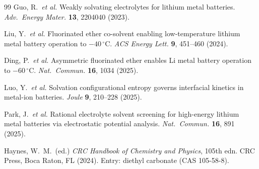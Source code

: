 \documentclass[11pt]{article}
\theoremstyle{plain}
\theoremstyle{definition}
\theoremstyle{remark}
\begin{document}
\begin{thebibliography}{99}
Guo, R.\ \textit{et al.}
Weakly solvating electrolytes for lithium metal batteries.
\textit{Adv.\ Energy Mater.} \textbf{13}, 2204040 (2023).

Liu, Y.\ \textit{et al.}
Fluorinated ether co-solvent enabling low-temperature lithium metal battery
operation to $-40\,^{\circ}$C.
\textit{ACS Energy Lett.} \textbf{9}, 451--460 (2024).

Ding, P.\ \textit{et al.}
Asymmetric fluorinated ether enables Li metal battery operation to
$-60\,^{\circ}$C.
\textit{Nat.\ Commun.} \textbf{16}, 1034 (2025).

Luo, Y.\ \textit{et al.}
Solvation configurational entropy governs interfacial kinetics in
metal-ion batteries.
\textit{Joule} \textbf{9}, 210--228 (2025).

Park, J.\ \textit{et al.}
Rational electrolyte solvent screening for high-energy lithium metal batteries
via electrostatic potential analysis.
\textit{Nat.\ Commun.} \textbf{16}, 891 (2025).

Haynes, W.\ M.\ (ed.)
\textit{CRC Handbook of Chemistry and Physics}, 105th edn.
CRC Press, Boca Raton, FL (2024).
Entry: diethyl carbonate (CAS 105-58-8).

\end{thebibliography}
\end{document}
